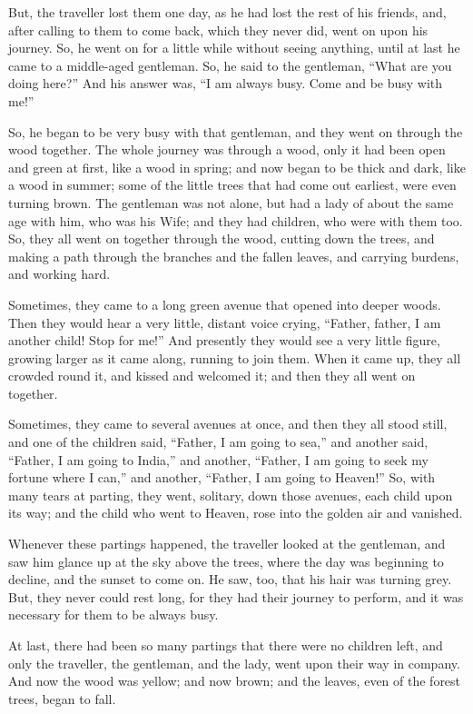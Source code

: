 But, the traveller lost them one day, as he had lost the rest of his
friends, and, after calling to them to come back, which they never
did, went on upon his journey.  So, he went on for a little while
without seeing anything, until at last he came to a middle-aged
gentleman.  So, he said to the gentleman, ``What are you doing here?''
And his answer was, ``I am always busy.  Come and be busy with me!''

So, he began to be very busy with that gentleman, and they went on
through the wood together.  The whole journey was through a wood,
only it had been open and green at first, like a wood in spring; and
now began to be thick and dark, like a wood in summer; some of the
little trees that had come out earliest, were even turning brown.
The gentleman was not alone, but had a lady of about the same age
with him, who was his Wife; and they had children, who were with
them too.  So, they all went on together through the wood, cutting
down the trees, and making a path through the branches and the
fallen leaves, and carrying burdens, and working hard.

Sometimes, they came to a long green avenue that opened into deeper
woods.  Then they would hear a very little, distant voice crying,
``Father, father, I am another child!  Stop for me!''  And presently
they would see a very little figure, growing larger as it came
along, running to join them.  When it came up, they all crowded
round it, and kissed and welcomed it; and then they all went on
together.

Sometimes, they came to several avenues at once, and then they all
stood still, and one of the children said, ``Father, I am going to
sea,'' and another said, ``Father, I am going to India,'' and another,
``Father, I am going to seek my fortune where I can,'' and another,
``Father, I am going to Heaven!''  So, with many tears at parting,
they went, solitary, down those avenues, each child upon its way;
and the child who went to Heaven, rose into the golden air and
vanished.

Whenever these partings happened, the traveller looked at the
gentleman, and saw him glance up at the sky above the trees, where
the day was beginning to decline, and the sunset to come on.  He
saw, too, that his hair was turning grey.  But, they never could
rest long, for they had their journey to perform, and it was
necessary for them to be always busy.

At last, there had been so many partings that there were no children
left, and only the traveller, the gentleman, and the lady, went upon
their way in company.  And now the wood was yellow; and now brown;
and the leaves, even of the forest trees, began to fall.

